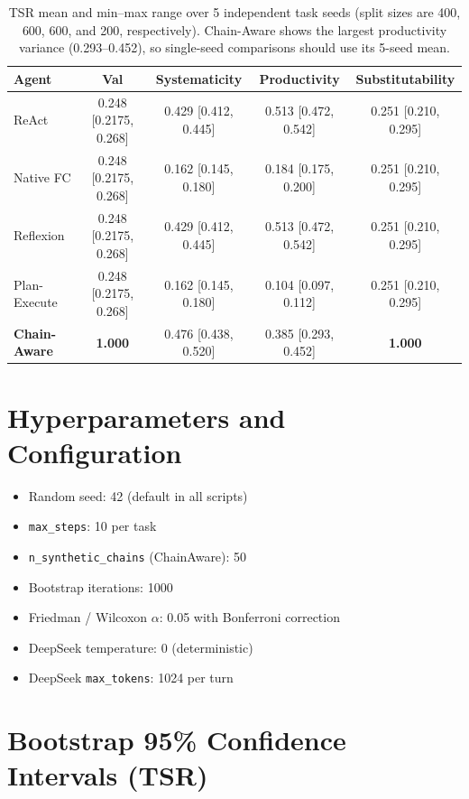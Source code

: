 ﻿\documentclass{article}
\begin{document}
\begin{table}[h]
\centering
\small
\begin{tabular}{lcccc}
\toprule
Agent & Val & Systematicity & Productivity & Substitutability \\
\midrule
ReAct & 0.248 [0.2175, 0.268] & 0.429 [0.412, 0.445] & 0.513 [0.472, 0.542] & 0.251 [0.210, 0.295] \\
Native FC & 0.248 [0.2175, 0.268] & 0.162 [0.145, 0.180] & 0.184 [0.175, 0.200] & 0.251 [0.210, 0.295] \\
Reflexion & 0.248 [0.2175, 0.268] & 0.429 [0.412, 0.445] & 0.513 [0.472, 0.542] & 0.251 [0.210, 0.295] \\
Plan-Execute & 0.248 [0.2175, 0.268] & 0.162 [0.145, 0.180] & 0.104 [0.097, 0.112] & 0.251 [0.210, 0.295] \\
\textbf{Chain-Aware} & \textbf{1.000} & 0.476 [0.438, 0.520] & 0.385 [0.293, 0.452] & \textbf{1.000} \\
\bottomrule
\end{tabular}
\caption{TSR mean and min--max range over 5 independent task seeds (split sizes are 400, 600, 600, and 200, respectively). Chain-Aware shows the largest productivity variance (0.293--0.452), so single-seed comparisons should use its 5-seed mean.}
\label{tab:seed_variance}
\end{table}\section{Hyperparameters and Configuration}

\begin{itemize}
    \item Random seed: 42 (default in all scripts)
    \item \texttt{max\_steps}: 10 per task
    \item \texttt{n\_synthetic\_chains} (ChainAware): 50
    \item Bootstrap iterations: 1000
    \item Friedman / Wilcoxon $\alpha$: 0.05 with Bonferroni correction
    \item DeepSeek temperature: 0 (deterministic)
    \item DeepSeek \texttt{max\_tokens}: 1024 per turn
\end{itemize}

\section{Bootstrap 95\% Confidence Intervals (TSR)}
\end{document}
